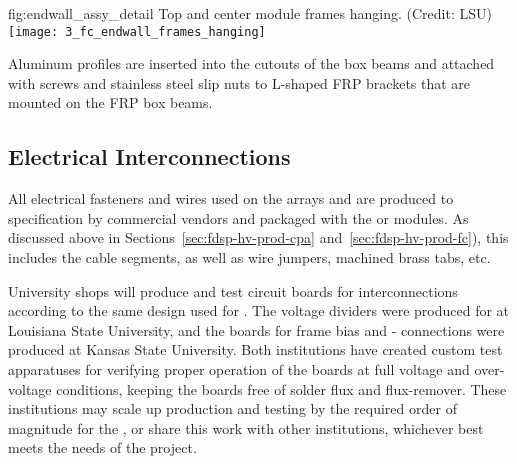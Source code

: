 \begin{dunefigure}{fig:endwall_assy_detail}{%
Top and center  module frames hanging. (Credit: LSU)}
\texttt{[image: 3\_fc\_endwall\_frames\_hanging]}
\end{dunefigure}


Aluminum profiles are inserted into the cutouts of the box beams and attached with screws and stainless steel slip nuts to L-shaped FRP brackets that are mounted on the FRP box beams. 

\subsection{Electrical Interconnections}
\label{sec:fdsp-hv-prod-interconnect}

All electrical fasteners and wires used on the  arrays and  are produced
to specification by commercial vendors and packaged with the  or  modules.  
As discussed above in Sections~\ref{sec:fdsp-hv-prod-cpa} and~\ref{sec:fdsp-hv-prod-fc}), 
this includes the  cable segments, as well as wire jumpers, machined brass
tabs, etc.

University shops will produce and test circuit boards for %
 interconnections according to the same design used for .  The  voltage dividers were produced for  at Louisiana State University, and the boards for  frame bias and - connections were produced at Kansas State University.
Both institutions have created custom test apparatuses for verifying proper operation of the boards at full voltage and over-voltage conditions, keeping the boards free of solder flux and flux-remover.  These institutions may scale up production and testing by the required order of magnitude for the , or share this work with other institutions, whichever best meets the needs of the project. %

